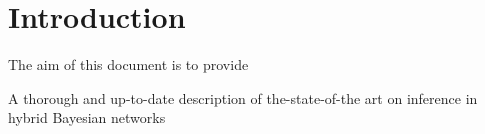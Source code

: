 \section{Introduction}

The aim of this document is to provide 


A thorough and up-to-date description of the-state-of-the art on inference in hybrid Bayesian networks

